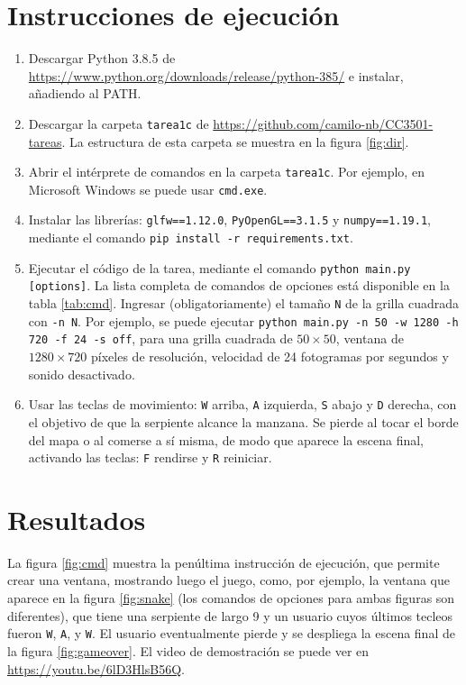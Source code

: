 \section{Instrucciones de ejecución}
\begin{enumerate}
	\item Descargar Python 3.8.5 de \url{https://www.python.org/downloads/release/python-385/} e instalar, añadiendo al PATH.
	
	\item Descargar la carpeta \texttt{tarea1c} de \url{https://github.com/camilo-nb/CC3501-tareas}. La estructura de esta carpeta se muestra en la figura \ref{fig:dir}.
	
	\item Abrir el intérprete de comandos en la carpeta \texttt{tarea1c}. Por ejemplo, en Microsoft Windows se puede usar \texttt{cmd.exe}.
	
	\item Instalar las librerías: \texttt{glfw==1.12.0}, \texttt{PyOpenGL==3.1.5} y \texttt{numpy==1.19.1}, mediante el comando \texttt{pip install -r requirements.txt}.
	
	\item Ejecutar el código de la tarea, mediante el comando \texttt{python main.py [options]}. La lista completa de comandos de opciones está disponible en la tabla \ref{tab:cmd}. Ingresar (obligatoriamente) el tamaño \texttt{N} de la grilla cuadrada con \texttt{-n N}. Por ejemplo, se puede ejecutar \texttt{python main.py -n 50 -w 1280 -h 720 -f 24 -s off}, para una grilla cuadrada de $50\times50$, ventana de $1280\times720$ píxeles de resolución, velocidad de 24 fotogramas por segundos y sonido desactivado.
	
	\item Usar las teclas de movimiento: \texttt{W} arriba, \texttt{A} izquierda, \texttt{S} abajo y \texttt{D} derecha, con el objetivo de que la serpiente alcance la manzana. Se pierde al tocar el borde del mapa o al comerse a sí misma, de modo que aparece la escena final, activando las teclas: \texttt{F} rendirse y \texttt{R} reiniciar.
\end{enumerate}


\section{Resultados}

La figura \ref{fig:cmd} muestra la penúltima instrucción de ejecución, que permite crear una ventana, mostrando luego el juego, como, por ejemplo, la ventana que aparece en la figura \ref{fig:snake} (los comandos de opciones para ambas figuras son diferentes), que tiene una serpiente de largo 9 y un usuario cuyos últimos tecleos fueron \texttt{W}, \texttt{A}, y \texttt{W}. El usuario eventualmente pierde y se despliega la escena final de la figura \ref{fig:gameover}. El video de demostración se puede ver en \url{https://youtu.be/6lD3HlsB56Q}.

